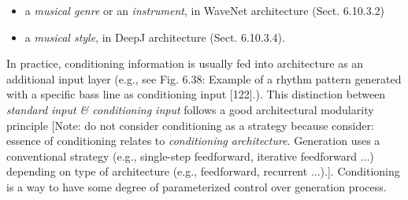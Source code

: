 \documentclass{article}
\begin{document}
\begin{itemize}
\begin{itemize}
\begin{itemize}
\begin{itemize}
				\item a {\it musical genre} or an {\it instrument}, in WaveNet architecture (Sect. 6.10.3.2)
				\item a {\it musical style}, in DeepJ architecture (Sect. 6.10.3.4).
			\end{itemize}
			In practice, conditioning information is usually fed into architecture as an additional input layer (e.g., see {\sf Fig. 6.38: Example of a rhythm pattern generated with a specific bass line as conditioning input [122].}). This distinction between {\it standard input \& conditioning input} follows a good architectural modularity principle [Note: do not consider conditioning as a strategy because consider: essence of conditioning relates to {\it conditioning architecture}. Generation uses a conventional strategy (e.g., single-step feedforward, iterative feedforward $\ldots$) depending on type of architecture (e.g., feedforward, recurrent $\ldots$).]. Conditioning is a way to have some degree of parameterized control over generation process.
			

\end{itemize}
\end{itemize}
\end{itemize}
\end{document}

